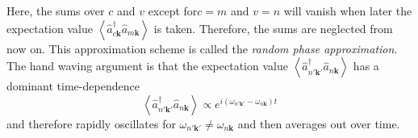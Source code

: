 Here, the sums over $c$ and $v$ except for$c=m$ and $v=n$ will
vanish when later the expectation value $\left\langle \hat{a}_{c\mathbf{k}}^{\dagger}\hat{a}_{m\mathbf{k}}\right\rangle $
is taken. Therefore, the sums are neglected from now on. This approximation
scheme is called the \emph{random phase approximation}. The hand waving
argument is that the expectation value $\left\langle \hat{a}_{n'\mathbf{k}'}^{\dagger}\hat{a}_{n\mathbf{k}}\right\rangle $
has a dominant time-dependence\begin{equation}
\left\langle \hat{a}_{n'\mathbf{k}'}^{\dagger}\hat{a}_{n\mathbf{k}}\right\rangle \propto e^{i\left(\omega_{n'\mathbf{k}'}-\omega_{n\mathbf{k}}\right)t}\label{eq:Random_Phase_Apprx}\end{equation}
and therefore rapidly oscillates for $\omega_{n'\mathbf{k}'}\neq\omega_{n\mathbf{k}}$
and then averages out over time.

